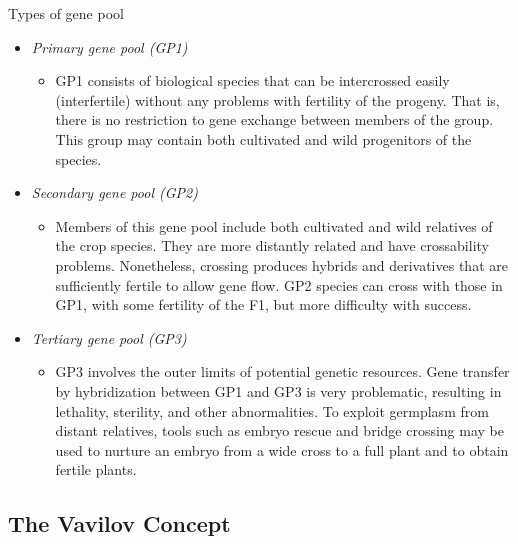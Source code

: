 \documentclass[
  ignorenonframetext,
  aspectratio=169]{beamer}
\providecommand{\tightlist}{%
  \setlength{\itemsep}{0pt}\setlength{\parskip}{0pt}}
\begin{document}
\begin{frame}{Types of gene pool}
\protect\hypertarget{types-of-gene-pool}{}
\begin{itemize}
\tightlist
\item
  \emph{Primary gene pool (GP1)}

  \begin{itemize}
  \tightlist
  \item
    GP1 consists of biological species that can be intercrossed easily
    (interfertile) without any problems with fertility of the progeny.
    That is, there is no restriction to gene exchange between members of
    the group. This group may contain both cultivated and wild
    progenitors of the species.
  \end{itemize}
\item
  \emph{Secondary gene pool (GP2)}

  \begin{itemize}
  \tightlist
  \item
    Members of this gene pool include both cultivated and wild relatives
    of the crop species. They are more distantly related and have
    crossability problems. Nonetheless, crossing produces hybrids and
    derivatives that are sufficiently fertile to allow gene flow. GP2
    species can cross with those in GP1, with some fertility of the F1,
    but more difficulty with success.
  \end{itemize}
\item
  \emph{Tertiary gene pool (GP3)}

  \begin{itemize}
  \tightlist
  \item
    GP3 involves the outer limits of potential genetic resources. Gene
    transfer by hybridization between GP1 and GP3 is very problematic,
    resulting in lethality, sterility, and other abnormalities. To
    exploit germplasm from distant relatives, tools such as embryo
    rescue and bridge crossing may be used to nurture an embryo from a
    wide cross to a full plant and to obtain fertile plants.
  \end{itemize}
\end{itemize}
\end{frame}

\hypertarget{the-vavilov-concept}{%
\subsection{The Vavilov Concept}\label{the-vavilov-concept}}
\end{document}
